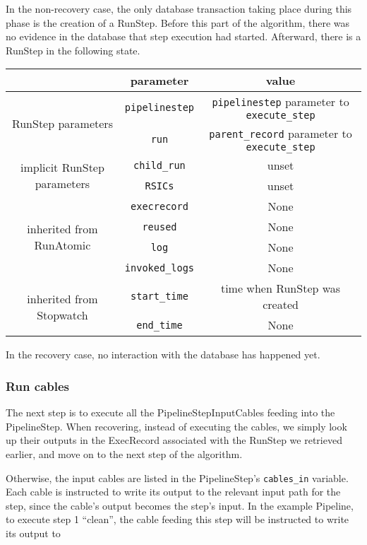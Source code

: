 \documentclass[12pt]{article}
\newcommand{\code}[1]{\texttt{#1}}
\begin{document}
In the non-recovery case, the only database transaction taking place during
this phase is the creation of a RunStep. Before this part of the algorithm,
there was no evidence in the database that step execution had started.
Afterward, there is a RunStep in the following state.
\begin{center}
  \begin{tabular}{|c|c|c|}
    \hline
    & \textbf{parameter} & \textbf{value} \\
    \hline
    \multirow{2}{*}{RunStep parameters} & \code{pipelinestep} & \code{pipelinestep} parameter to \code{execute\_step} \\
    & \code{run} & \code{parent\_record} parameter to \code{execute\_step} \\
    \hline
    \multirow{2}{*}{implicit RunStep parameters} & \code{child\_run} & unset \\
    & \code{RSICs} & unset \\
    \hline
    \multirow{4}{*}{inherited from RunAtomic} & \code{execrecord} & None \\
    & \code{reused} & None \\
    & \code{log} & None \\
    & \code{invoked\_logs} & None \\
    \hline
    \multirow{2}{*}{inherited from Stopwatch} & \code{start\_time} & time when RunStep was created \\
    & \code{end\_time} & None \\
    \hline
  \end{tabular}
\end{center}

In the recovery case, no interaction with the database has happened yet.

\subsubsection*{Run cables}

The next step is to execute all the PipelineStepInputCables feeding into the
PipelineStep. When recovering, instead of executing the cables, we simply look
up their outputs in the ExecRecord associated with the RunStep we retrieved
earlier, and move on to the next step of the algorithm.

Otherwise, the input cables are listed in the PipelineStep's \code{cables\_in}
variable.  Each cable is instructed to write its output to the relevant input
path for the step, since the cable's output becomes the step's input. In the
example Pipeline, to execute step 1 ``clean'', the cable feeding this step will
be instructed to write its output to
\end{document}
